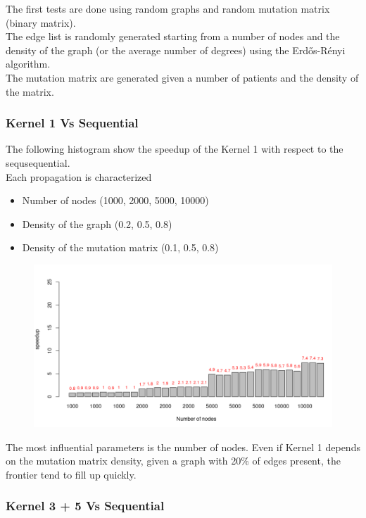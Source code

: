 \documentclass[a4paper]{article}
\begin{document}
The first tests are done using random graphs and random mutation matrix (binary
matrix).\\
The edge list is randomly generated starting from a number of nodes and the
density of the graph (or the average number of degrees) using the Erdős-Rényi
algorithm.\\
The mutation matrix are generated given a number of patients and the density
of the matrix.

\subsubsection{Kernel 1 Vs Sequential}

The following histogram show the speedup of the Kernel 1 with respect to the
sequsequential.\\
Each propagation is characterized
\begin{itemize}
    \item Number of nodes (1000, 2000, 5000, 10000)
    \item Density of the graph (0.2, 0.5, 0.8)
    \item Density of the mutation matrix (0.1, 0.5, 0.8)
\end{itemize}

\begin{figure}[H]
    \centering
    \includegraphics[width=\textwidth]{img/2020-07-12-20:50:02.png}
\end{figure}

The most influential parameters is the number of nodes. 
Even if Kernel 1 depends on the mutation matrix density, given a graph with 20\%
of edges present, the frontier tend to fill up quickly.

\newpage
\subsubsection{Kernel 3 + 5 Vs Sequential}
\end{document}

